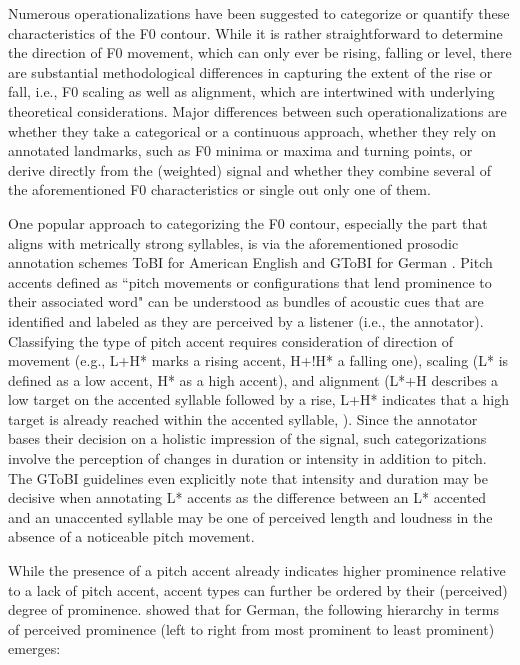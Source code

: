 Numerous operationalizations have been suggested to categorize or quantify these characteristics of the F0 contour. While it is rather straightforward to determine the direction of F0 movement, which can only ever be rising, falling or level, there are substantial methodological differences in capturing the extent of the rise or fall, i.e., F0 scaling as well as alignment, which are intertwined with underlying theoretical considerations. Major differences between such operationalizations are whether they take a categorical or a continuous approach, whether they rely on annotated landmarks, such as F0 minima or maxima and turning points, or derive directly from the (weighted) signal and whether they combine several of the aforementioned F0 characteristics or single out only one of them.

One popular approach to categorizing the F0 contour, especially the part that aligns with metrically strong syllables, is via the aforementioned prosodic annotation schemes ToBI for American English \citep{silvermanTOBIStandardLabeling1992,beckmanOriginalToBiSystem2005} and GToBI for German \citep{griceConsistencyTranscriptionLabelling1996, griceDeutscheIntonationUnd2002}. Pitch accents defined as ``pitch movements or configurations that lend prominence to their associated word" \citep[868]{silvermanTOBIStandardLabeling1992} can be understood as bundles of acoustic cues that are identified and labeled as they are perceived by a listener (i.e., the annotator). Classifying the type of pitch accent requires consideration of direction of movement (e.g., L+H* marks a rising accent, H+!H* a falling one), scaling (L* is defined as a low accent, H* as a high accent), and alignment (L*+H describes a low target on the accented syllable followed by a rise, L+H* indicates that a high target is already reached within the accented syllable, \citealt[see][]{griceGermanIntonationAutosegmentalMetrical2005}). Since the annotator bases their decision on a holistic impression of the signal, such categorizations involve the perception of changes in duration or intensity in addition to pitch. The GToBI guidelines even explicitly note that intensity and duration may be decisive when annotating L* accents \citep[278]{baumannImportanceTonalCues2014, griceDeutscheIntonationUnd2002} as the difference between an L* accented and an unaccented syllable may be one of perceived length and loudness in the absence of a noticeable pitch movement. 

While the presence of a pitch accent already indicates higher prominence relative to a lack of pitch accent, accent types can further be ordered by their (perceived) degree of prominence. \citet{baumannPerceptualProminencePitch2015} showed that for German, the following hierarchy in terms of perceived prominence (left to right from most prominent to least prominent) emerges: 

